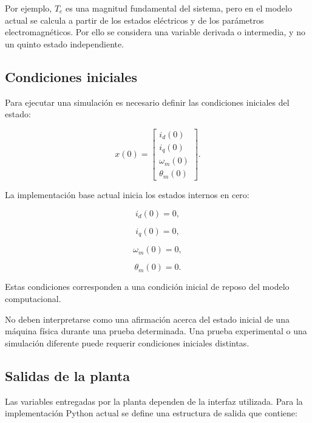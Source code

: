 Por ejemplo, $T_e$ es una magnitud fundamental del sistema, pero en el modelo actual se calcula a partir de los estados eléctricos y de los parámetros electromagnéticos. Por ello se considera una variable derivada o intermedia, y no un quinto estado independiente.

\subsection{Condiciones iniciales}

Para ejecutar una simulación es necesario definir las condiciones iniciales del estado:

\begin{equation}
x(0)=
\begin{bmatrix}
i_d(0)\\
i_q(0)\\
\omega_m(0)\\
\theta_m(0)
\end{bmatrix}.
\end{equation}

La implementación base actual inicia los estados internos en cero:

\begin{equation}
i_d(0)=0,
\end{equation}

\begin{equation}
i_q(0)=0,
\end{equation}

\begin{equation}
\omega_m(0)=0,
\end{equation}

\begin{equation}
\theta_m(0)=0.
\end{equation}

Estas condiciones corresponden a una condición inicial de reposo del modelo computacional.

No deben interpretarse como una afirmación acerca del estado inicial de una máquina física durante una prueba determinada. Una prueba experimental o una simulación diferente puede requerir condiciones iniciales distintas.

\subsection{Salidas de la planta}

Las variables entregadas por la planta dependen de la interfaz utilizada. Para la implementación Python actual se define una estructura de salida que contiene:

